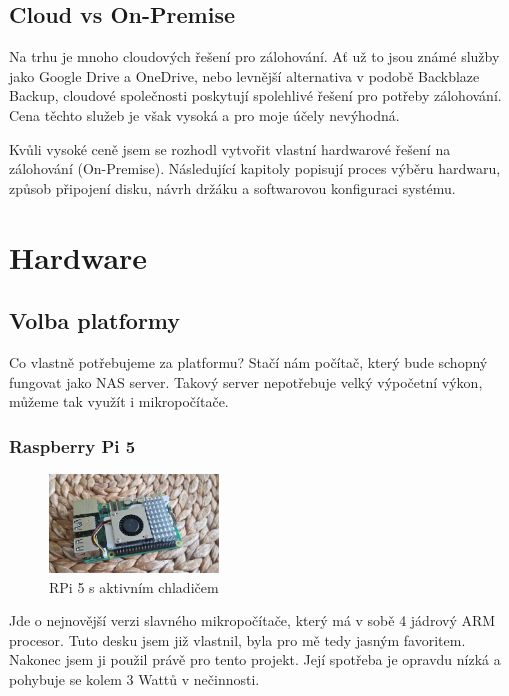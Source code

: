 \documentclass[a4paper,12pt, oneside]{book}
\begin{document}
\section{Cloud vs On-Premise}

Na trhu je mnoho cloudových řešení pro zálohování. 
Ať už to jsou známé služby jako Google Drive a OneDrive, nebo 
levnější alternativa v podobě Backblaze Backup, cloudové společnosti poskytují 
spolehlivé řešení pro potřeby zálohování. Cena těchto služeb je však vysoká a pro moje účely nevýhodná. 

Kvůli vysoké ceně jsem se rozhodl vytvořit vlastní hardwarové řešení na
zálohování (On-Premise).
Následující kapitoly popisují
proces výběru hardwaru, způsob připojení disku, návrh držáku a softwarovou
konfiguraci systému.


\chapter{Hardware}
\section{Volba platformy}

Co vlastně potřebujeme za platformu? Stačí nám počítač, který bude 
schopný fungovat jako NAS server. Takový server nepotřebuje velký
výpočetní výkon, můžeme tak využít i mikropočítače. 


\subsection{Raspberry Pi 5}

\begin{figure}
	\centering
	\includegraphics[width=0.4\textwidth]{img/rpi5-active-cooler-c.jpg}
	\caption{RPi 5 s aktivním chladičem}
\end{figure}
Jde o nejnovější verzi slavného mikropočítače, který má v sobě 4 jádrový ARM
procesor. Tuto desku jsem již vlastnil, byla pro mě tedy jasným favoritem.
Nakonec jsem ji použil právě pro tento projekt. Její spotřeba je opravdu nízká
a pohybuje se kolem 3 Wattů v nečinnosti.  \cite{RPi-Power}
\end{document}
